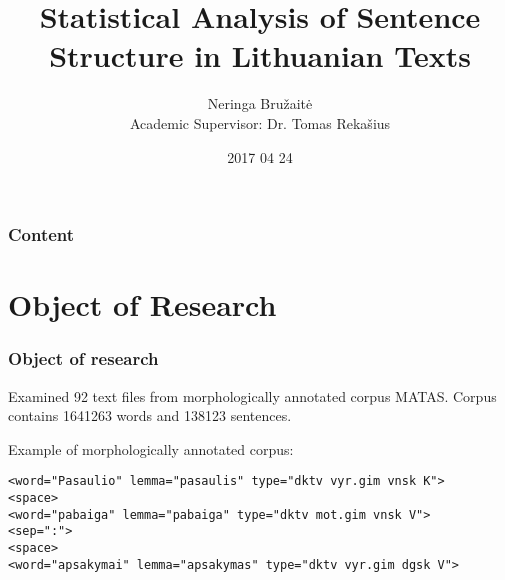 \documentclass{beamer}
\institute[]{
Vilnius Gediminas Technical University
}
\title[]
{\centering  
Statistical Analysis of Sentence Structure in Lithuanian Texts
}
\author[Neringa Bružaitė, Tomas Rekašius]
{ 
 Neringa Bružaitė \bigskip \\  \small 
 Academic Supervisor: Dr. Tomas Rekašius \vspace{5mm}
}
\date{ \tiny 2017 04 24}
\begin{document}
\begin{frame}
\titlepage %
\end{frame}

\begin{frame}
\frametitle{Content} 
\tableofcontents 
\end{frame}


\section{Object of Research} 



\begin{frame}[fragile]
\frametitle{Object of research}
%
Examined \alert{92} text files from morphologically annotated corpus MATAS.
\smallskip
Corpus contains \alert{1641263} words and \alert{138123} sentences.
%
\bigskip

Example of morphologically annotated corpus:
%
\begin{Verbatim}[frame=single, fontsize=\small]
<word="Pasaulio" lemma="pasaulis" type="dktv vyr.gim vnsk K">
<space>
<word="pabaiga" lemma="pabaiga" type="dktv mot.gim vnsk V">
<sep=":">
<space>
<word="apsakymai" lemma="apsakymas" type="dktv vyr.gim dgsk V">
\end{Verbatim}
%
\end{frame}

\end{document}
